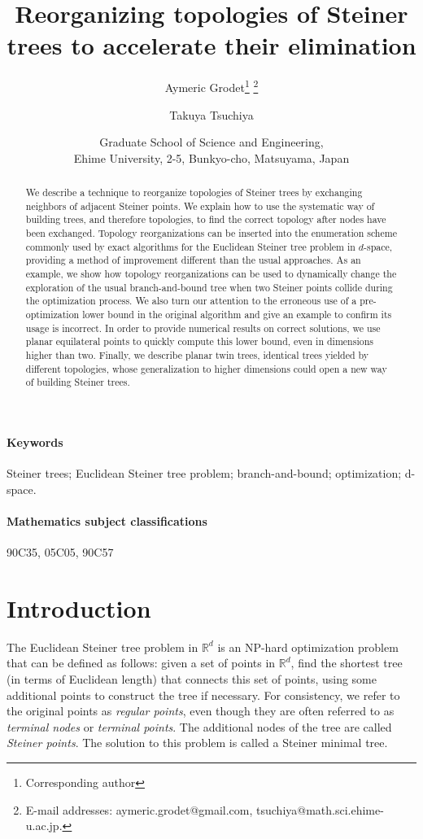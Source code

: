 \documentclass{article}
\title{Reorganizing topologies of Steiner trees to accelerate their elimination}
\author{
  Aymeric Grodet\thanks{Corresponding author} \thanks{E-mail addresses: aymeric.grodet@gmail.com,
    tsuchiya@math.sci.ehime-u.ac.jp.}
  \and
  Takuya Tsuchiya\footnotemark[2]
}
\date{Graduate School of Science and Engineering, \\Ehime University, 2-5, Bunkyo-cho, Matsuyama, Japan}
\theoremstyle{plain}
\begin{document}
\maketitle

\begin{abstract}
We describe a technique to reorganize topologies of Steiner trees by exchanging neighbors of adjacent Steiner points. 
We explain how to use the systematic way of building trees, and therefore topologies, to find the correct topology after nodes have been exchanged. 
Topology reorganizations can be inserted into the enumeration scheme commonly used by exact algorithms for the Euclidean Steiner tree problem in $d$-space, providing a method of improvement different than the usual approaches. 
As an example, we show how topology reorganizations can be used to dynamically change the exploration of the usual branch-and-bound tree when two Steiner points collide during the optimization process. 
We also turn our attention to the erroneous use of a pre-optimization lower bound in the original algorithm and give an example to confirm its usage is incorrect.
In order to provide numerical results on correct solutions, we use planar equilateral points to quickly compute this lower bound, even in dimensions higher than two. 
Finally, we describe planar twin trees, identical trees yielded by different topologies, whose generalization to higher dimensions could open a new way of building Steiner trees.
\end{abstract}

\paragraph{Keywords}Steiner trees; Euclidean Steiner tree problem; branch-and-bound; optimization; d-space.

\paragraph{Mathematics subject classifications}90C35, 05C05, 90C57








\section{Introduction}

The Euclidean Steiner tree problem in $\mathbb{R}^{d}$ is an NP-hard optimization problem \cite{Garey} that can be defined as follows: given a set of points in $\mathbb{R}^{d}$, find the shortest tree (in terms of Euclidean length) that connects this set of points, using some additional points to construct the tree if necessary. 
For consistency, we refer to the original points as \emph{regular points}, even though they are often referred to as \emph{terminal nodes} or \emph{terminal points}. 
The additional nodes of the tree are called \emph{Steiner points}. 
The solution to this problem is called a Steiner minimal tree. 
\end{document}
